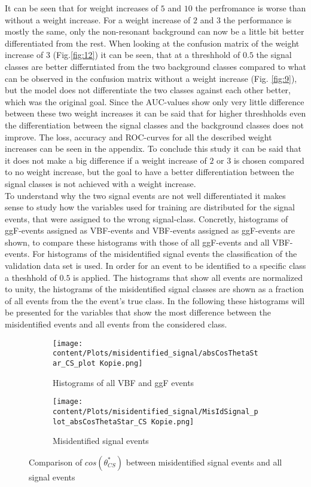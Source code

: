 It can be seen that for weight increases of $5$ and $10$ the perfromance is worse than without a weight increase. For a weight increase of $2$ and $3$ the performance is mostly the same, only
the non-resonant background can now be a little bit better differentiated from the rest. When looking at the confusion matrix of the weight increase of $3$ (Fig.\ref{fig:12}) it can be seen, that at a threshhold of $0.5$
the signal classes are better differntiated from the two background classes compared to what can be observed in the confusion matrix without a weight increase (Fig. \ref{fig:9}), but the model does not differentiate the two classes against each other better, which was the original goal.
Since the AUC-values show only very little difference between these two weight increases it can be said that for higher threshholds even the differentiation between the signal classes and the background classes
does not improve. The loss, accuracy and ROC-curves for all the described weight increases can be seen in the appendix. To conclude this study it can be said that it does not make a big difference if a weight
increase of $2$ or $3$ is chosen compared to no weight increase, but the goal to have a better differentiation between the signal classes is not achieved with a weight increase. \\

To understand why the two signal events are not well differentiated it makes sense to study how the variables used for training are distributed for the signal events, that were assigned to the wrong signal-class.
Concretly, histograms of ggF-events assigned as VBF-events and VBF-events assigned as ggF-events are shown, to compare these histograms with those of all ggF-events and all VBF-events. For histograms of the misidentified signal events
the classification of the validation data set is used. In order for an event to be identified to a specific class a theshhold of $0.5$ is applied. The histograms that show all events are normalized to unity, the histograms of the misidentified signal classes
are shown as a fraction of all events from the the event's true class.
In the following these histograms will be presented for the variables that show the most difference between the misidentified events and all events from the considered class.


\begin{figure}[H]
    \centering
    \begin{subfigure}{0.45\textwidth}
        \centering
        \texttt{[image: content/Plots/misidentified\_signal/absCosThetaStar\_CS\_plot Kopie.png]}
        \caption{Histograms of all VBF and ggF events}
        \label{fig:roc1}
    \end{subfigure}
    \hfill
    \begin{subfigure}{0.45\textwidth}
        \centering
        \texttt{[image: content/Plots/misidentified\_signal/MisIdSignal\_plot\_absCosThetaStar\_CS Kopie.png]}
        \caption{Misidentified signal events}
        \label{fig:roc2}
    \end{subfigure}
    \caption{Comparison of $cos(\theta_{CS}^*)$ between misidentified signal events and all signal events}
    \label{fig:combined_roc}
\end{figure}

